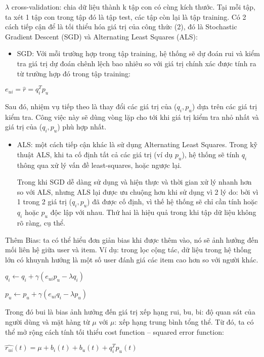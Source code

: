\documentclass[a4paper,12pt,numbered,print,index,custombib, oneside, custommargin]{report}
\newcommand\tab[1][1cm]{\hspace*{#1}}
\begin{document}
$\lambda$ cross-validation: chia dữ liệu thành k tập con có cùng kích thước. Tại mỗi tập, ta xét 1 tập con trong tập đó là tập test, các tập còn lại là tập training.
Có 2 cách tiếp cận để là tối thiểu hóa giá trị của công thức (2), đó là Stochastic Gradient Descent (SGD) và Alternating Least Squares (ALS):
\begin{itemize}
\item SGD: Với mỗi trường hợp trong tập training, hệ thống sẽ dự đoán rui và kiểm tra giá trị dự đoán chênh lệch bao nhiêu so với giá trị chính xác được tính ra từ trường hợp đó trong tập training:
\end{itemize} \par

\tab $e_{ui} = \hat{r} = q_i^T p_u $	\par


\tab Sau đó, nhiệm vụ tiếp theo là 	thay đổi các giá trị của ($q_i, p_u$) dựa trên các \tab giá trị kiểm tra. Công việc này sẽ dùng vòng lặp cho tới khi giá trị kiểm tra \tab nhỏ nhất và giá trị của ($q_i, p_u$) phù hợp nhất.
\begin{itemize}
\item ALS: một cách tiếp cận khác là sử dụng Alternating Least Squares. Trong kỹ thuật ALS, khi ta cố định tất cả các giá trị (ví dụ $p_u$), hệ thống sẽ tính $q_i$ thông qua xử lý vấn đề least-squares, hoặc ngược lại.\par
Trong khi SGD dễ dàng sử dụng và hiện thực và thời gian xử lý nhanh hơn so với ALS, nhưng ALS lại được ưu chuộng hơn khi sử dụng vì 2 lý do: bởi vì 1 trong 2 giá trị ($q_i, p_u$) đã được cố định, vì thế hệ thống sẽ chỉ cần tính hoặc $q_i$ hoặc $p_u$ độc lập với nhau. Thứ hai là hiệu quả trong khi tập dữ liệu không rõ ràng, cụ thể. 
\end{itemize}
Thêm Bias: ta có thể hiểu đơn giản bias khi được thêm vào, nó sẽ ảnh hưởng đến mối liên hệ giữa user và item. Ví dụ: trong lọc cộng tác, dữ liệu trong hệ thống lớn có khuynh hướng là một số user đánh giá các item cao hơn so với người khác.

\tab $q_i \leftarrow q_i + \gamma(e_{ui}p_{u} - \lambda q_i)$ \par
\tab $p_u \leftarrow p_u + \gamma(e_{ui}q_{i} - \lambda p_u)$ \par


Trong đó bui là bias ảnh hưởng đến giá trị xếp hạng rui, bu, bi: độ quan sát của người dùng và mặt hàng từ $\mu$ với $\mu$: xếp hạng trung bình tổng thể. 
Từ đó, ta có thể mở rộng cách tính tối thiểu cost function – squared error function: \par 
\tab $\hat{r_{ui}}(t) = \mu + b_i(t) +b_u(t) + q_i^T p_u(t)$ \par
\end{document}
